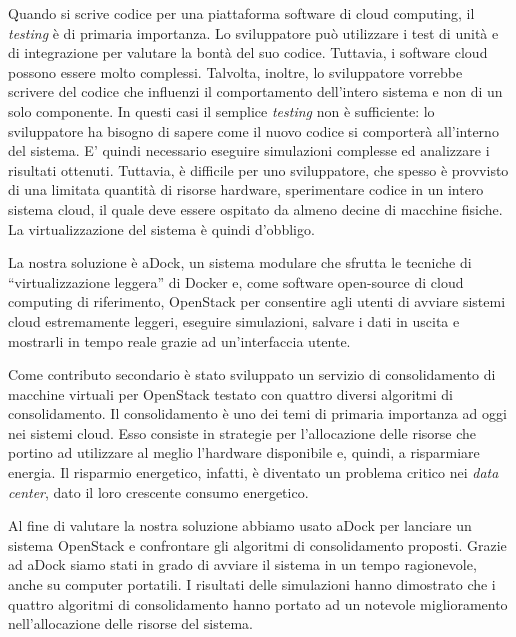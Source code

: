 \begin{spacing}{1.1}
Quando si scrive codice per una piattaforma software di cloud computing, il \emph{testing} è di primaria importanza. Lo sviluppatore può utilizzare i test di unità e di integrazione per valutare la bontà del suo codice. Tuttavia, i software cloud possono essere molto complessi. Talvolta, inoltre, lo sviluppatore vorrebbe scrivere del codice che influenzi il comportamento dell'intero sistema e non di un solo componente. In questi casi il semplice \emph{testing} non è sufficiente: lo sviluppatore ha bisogno di sapere come il nuovo codice si comporterà all'interno del sistema. E' quindi necessario eseguire simulazioni complesse ed analizzare i risultati ottenuti. Tuttavia, è difficile per uno sviluppatore, che spesso è provvisto di una limitata quantità di risorse hardware, sperimentare codice in un intero sistema cloud, il quale deve essere ospitato da almeno decine di macchine fisiche. La virtualizzazione del sistema è quindi d'obbligo.

La nostra soluzione è aDock, un sistema modulare che sfrutta le tecniche di ``virtualizzazione leggera'' di Docker e, come software open-source di cloud computing di riferimento, OpenStack per consentire agli utenti di avviare sistemi cloud estremamente leggeri, eseguire simulazioni, salvare i dati in uscita e mostrarli in tempo reale grazie ad un'interfaccia utente.

Come contributo secondario è stato sviluppato un servizio di consolidamento di macchine virtuali per OpenStack testato con quattro diversi algoritmi di consolidamento. Il consolidamento è uno dei temi di primaria importanza ad oggi nei sistemi cloud. Esso consiste in strategie per l'allocazione delle risorse che portino ad utilizzare al meglio l'hardware disponibile e, quindi, a risparmiare energia. Il risparmio energetico, infatti, è diventato un problema critico nei \emph{data center}, dato il loro crescente consumo energetico.

Al fine di valutare la nostra soluzione abbiamo usato aDock per lanciare un sistema OpenStack e confrontare gli algoritmi di consolidamento proposti. Grazie ad aDock siamo stati in grado di avviare il sistema in un tempo ragionevole, anche su computer portatili. I risultati delle simulazioni hanno dimostrato che i quattro algoritmi di consolidamento hanno portato ad un notevole miglioramento nell'allocazione delle risorse del sistema.
\end{spacing}